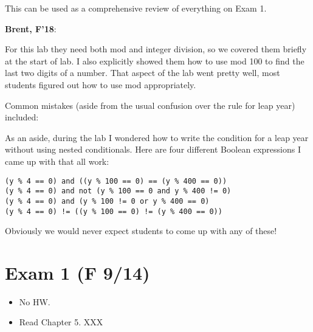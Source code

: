\documentclass{article}
\newenvironment{reflect}[1]
{
  \noindent
  \begin{lrbox}{\reflectbox}
    \begin{minipage}[t]{\textwidth}
      \textbf{#1}:
}{
    \end{minipage}
  \end{lrbox}
  \fbox{\usebox{\reflectbox}}
}
\begin{document}
This can be used as a comprehensive review of everything on Exam 1.

\begin{reflect}{Brent, F'18}
  For this lab they need both mod and integer division, so we covered
  them briefly at the start of lab.  I also explicitly showed them how
  to use mod 100 to find the last two digits of a number.  That aspect
  of the lab went pretty well, most students figured out how to use
  mod appropriately.

  Common mistakes (aside from the usual confusion over the rule for
  leap year) included:

  As an aside, during the lab I wondered how to write the condition
  for a leap year without using nested conditionals.  Here are four
  different Boolean expressions I came up with that all work:
\begin{verbatim}
(y % 4 == 0) and ((y % 100 == 0) == (y % 400 == 0))
(y % 4 == 0) and not (y % 100 == 0 and y % 400 != 0)
(y % 4 == 0) and (y % 100 != 0 or y % 400 == 0)
(y % 4 == 0) != ((y % 100 == 0) != (y % 400 == 0))
\end{verbatim}
  Obviously we would never expect students to come up with any of these!
\end{reflect}

\newpage
\section{Exam 1 (F 9/14)}

\begin{itemize}
\item No HW.
\item Read Chapter 5. XXX
\end{itemize}


\end{document}
